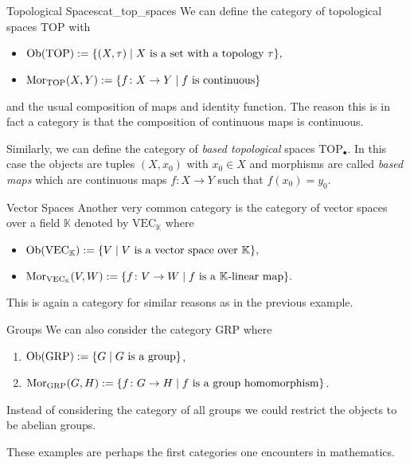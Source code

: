 \begin{example}{Topological Spaces}{cat_top_spaces}
We can define the category of topological spaces $\mathrm{TOP}$ with
\begin{itemize}
    \item $\mathrm {Ob}(\mathrm{TOP}) := \{(X,\tau) \mid \text{$X$ is a set with a topology $\tau$}\},$
    \item $\mathrm {Mor}_{\mathrm{TOP}}(X,Y) := \{f\colon X \to Y \mid \text{$f$ is continuous}\}$
\end{itemize}
and the usual composition of maps and identity function. The reason this is in fact a category is that the composition of continuous maps is continuous.
\medskip

Similarly, we can define the category of \emph{based topological} spaces $\mathrm{TOP}_\bullet$. In this case the objects are tuples $(X,x_0)$ with $x_0 \in X$ and morphisms are called \emph{based maps} which are continuous maps $f\colon X \to Y$ such that $f(x_0) = y_0$.
\end{example}

\begin{example}{Vector Spaces}{}
Another very common category is the category of vector spaces over a field $\mathbb{K}$ denoted by $\mathrm{VEC}_\mathbb{K}$ where
\begin{itemize}
    \item $\mathrm {Ob}(\mathrm{VEC}_\mathbb{K}) := \{V \mid \text{$V$ is a vector space over $\mathbb{K}$}\},$
    \item $\mathrm {Mor}_{\mathrm{VEC}_\mathbb{K}}(V,W) := \{f\colon V \to W \mid \text{$f$ is a $\mathbb{K}$-linear map}\}.$
\end{itemize}
This is again a category for similar reasons as in the previous example.
\end{example}

\begin{example}{Groups}{}
We can also consider the category $\mathrm{GRP}$ where
\begin{enumerate}
    \item $\mathrm {Ob}(\mathrm{GRP}) := \{G \mid \text{$G$ is a group}\}$,
    \item $\mathrm {Mor}_{\mathrm{GRP}}(G,H) := \{f\colon G \to H \mid \text{$f$ is a group homomorphism}\}$.
\end{enumerate}
Instead of considering the category of all groups we could restrict the objects to be abelian groups.
\end{example}

These examples are perhaps the first categories one encounters in mathematics. 

